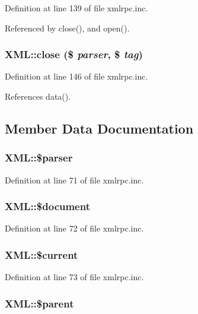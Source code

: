 Definition at line 139 of file xmlrpc.inc.

Referenced by close(), and open().\hypertarget{classXML_60144a2134fc1b7f5b4b1b6a7c56bf04}{
\subsubsection{\setlength{\rightskip}{0pt plus 5cm}XML::close (\$ {\em parser}, \$ {\em tag})}}
\label{classXML_60144a2134fc1b7f5b4b1b6a7c56bf04}




Definition at line 146 of file xmlrpc.inc.

References data().

\subsection{Member Data Documentation}
\hypertarget{classXML_fa14fbca44236b30ab5f3dcfc4b02890}{
\subsubsection{\setlength{\rightskip}{0pt plus 5cm}XML::\$parser}}
\label{classXML_fa14fbca44236b30ab5f3dcfc4b02890}




Definition at line 71 of file xmlrpc.inc.\hypertarget{classXML_01d565098eeda8bf09e4242a2748d570}{
\subsubsection{\setlength{\rightskip}{0pt plus 5cm}XML::\$document}}
\label{classXML_01d565098eeda8bf09e4242a2748d570}




Definition at line 72 of file xmlrpc.inc.\hypertarget{classXML_7c20d75c1719294f3320a537a32753ca}{
\subsubsection{\setlength{\rightskip}{0pt plus 5cm}XML::\$current}}
\label{classXML_7c20d75c1719294f3320a537a32753ca}




Definition at line 73 of file xmlrpc.inc.\hypertarget{classXML_fa51193c2f0b317f817fa3efa8722227}{
\subsubsection{\setlength{\rightskip}{0pt plus 5cm}XML::\$parent}}
\label{classXML_fa51193c2f0b317f817fa3efa8722227}





